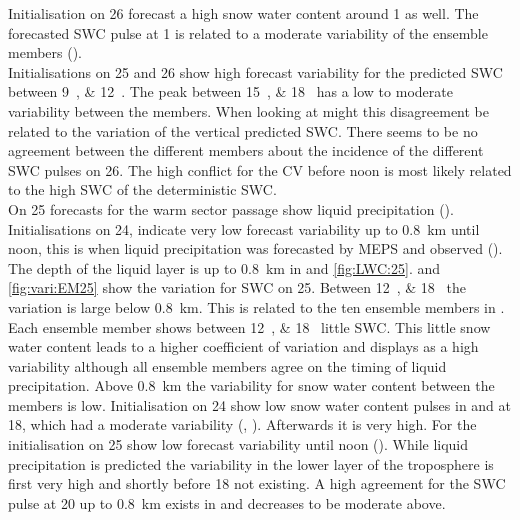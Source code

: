 Initialisation on \SI{26}{\dec} forecast a high snow water content around \SI{1}{\UTC} as well. The forecasted SWC pulse at \SI{1}{\UTC} is related to a moderate variability of the ensemble members (). 
\\
Initialisations on \num{25} and \SI{26}{\dec} show high forecast variability for the predicted SWC between \SIlist{9;12}{\UTC}. The peak between \SIlist{15;18}{\UTC} has a low to moderate variability between the members. When looking at  might this disagreement be related to the variation of the vertical predicted SWC. There seems to be no agreement between the different members about the incidence of the different SWC pulses on \SI{26}{\dec}. The high conflict for the CV before noon is most likely related to the high SWC of the deterministic SWC.
\\
On \SI{25}{\dec} forecasts for the warm sector passage show liquid precipitation ().
%
Initialisations on \SI{24}{\dec}, indicate very low forecast variability up to \SI{0.8}{\km} until noon, this is when liquid precipitation was forecasted by MEPS and observed ().
The depth of the liquid layer is up to \SI{0.8}{\km} in  and \ref{fig:LWC:25}. 
 and \ref{fig:vari:EM25} show the variation for SWC on \SI{25}{\dec}. Between \SIlist{12;18}{\UTC} the variation is large below \SI{0.8}{\km}. This is related to the ten ensemble members in . Each ensemble member shows between \SIlist{12;18}{\UTC} little SWC. This little snow water content leads to a higher coefficient of variation and displays as a high variability although all ensemble members agree on the timing of liquid precipitation.
Above \SI{0.8}{\km} the variability for snow water content between the members is low. Initialisation on \SI{24}{\dec} show low snow water content pulses in  and  at \SI{18}{\UTC}, which had a moderate variability (, ). Afterwards it is very high. For the initialisation on \SI{25}{\dec} show low forecast variability until noon (). While liquid precipitation is predicted the variability in the lower layer of the troposphere is first very high and shortly before \SI{18}{\UTC} not existing. A high agreement for the SWC pulse at \SI{20}{\UTC} up to \SI{0.8}{\km} exists in  and decreases to be moderate above.
